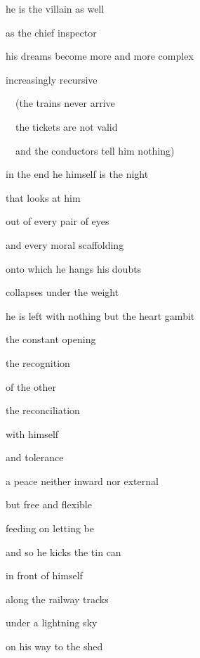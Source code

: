 \bigskip

he is the villain as well

as the chief inspector


\bigskip

his dreams become more and more complex

increasingly recursive


\bigskip

\ \ (the trains never arrive

\ \ the tickets are not valid

\ \  and the conductors tell him nothing)


\bigskip


\bigskip


\bigskip

in the end he himself is the night

that looks at him

out of every pair of eyes


\bigskip

and every moral scaffolding

onto which he hangs his doubts

collapses under the weight


\bigskip


\bigskip

he is left with nothing but the heart gambit


\bigskip

the constant opening

the recognition

of the other

the reconciliation

with himself

and tolerance


\bigskip

a peace neither inward nor external

but free and flexible

feeding on letting be


\bigskip


\bigskip


\bigskip

and so he kicks the tin can

in front of himself

along the railway tracks

under a lightning sky

on his way to the shed


\bigskip

